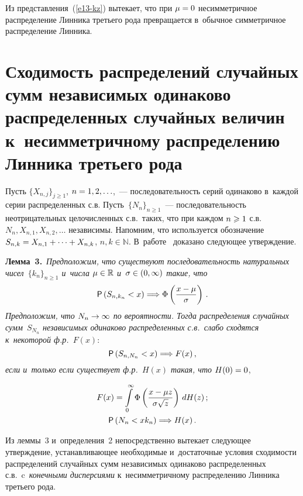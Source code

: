 \begin{multicols}{2}
\smallskip

Из представления~(\ref{e13-kz}) вытекает, что при $\mu\hm=0$ несимметричное
распределение Линника третьего рода превращается в~обычное
симметричное распределение Линника.

\section{Сходимость распределений случайных сумм независимых одинаково
распределенных случайных величин к~несимметричному распределению
Линника третьего рода}

Пусть $\{X_{n,j}\}_{j\geqslant1}$, $n\hm=1,2,\ldots$,~--- последовательность
серий одинаково в~каждой серии распределенных с.в. Пусть~$\{N_n\}_{n\geqslant1}$~--- 
последовательность неотрицательных
целочисленных с.в.\ таких, что при каждом $n\hm\geqslant1$ 
с.в.~$N_n,X_{n,1},X_{n,2},\ldots$ независимы. Напомним, что используется
обозначение $S_{n,k}\hm=X_{n,1}+\cdots +X_{n,k}$, $n,k\in\mathbb{N}$. 
В~работе~\cite{Korolev2013} доказано следующее утверждение.

\smallskip

\noindent
\textbf{Лемма~3.}\ \textit{Предположим, что существуют последовательность
натуральных чисел~$\{k_n\}_{n\geqslant 1}$ и~числа $\mu\hm\in\mathbb{R}$ 
и~$\sigma\hm\in(0,\infty)$ такие, что}
\begin{equation}
{\sf P}\left(S_{n,k_n}<x\right)\Longrightarrow
\Phi\left(\displaystyle\frac{\displaystyle x-\mu\mathstrut}{\displaystyle \sigma\mathstrut}\right)\,.\label{e19-kz}
\end{equation}
\textit{Предположим, что $N_n\hm\to\infty$ по вероятности. Тогда распределения
случайных сумм~$S_{N_n}$ независимых одинаково распределенных с.в.\
слабо сходятся к~некоторой ф.р.~$F(x)$}:
$$
{\sf P}\left(S_{n,N_n}<x\right)\Longrightarrow F(x)\,,
$$
\textit{если и~только если существует ф.р.~$H(x)$ такая, что $H(0)\hm=0$},

\noindent
\begin{gather*}
F(x)=\int\limits_{0}^{\infty}\Phi\left(\displaystyle\frac{\displaystyle x-\mu z\mathstrut}{\displaystyle \sigma\sqrt{z}\mathstrut}\right)\,dH(z)\,;
\\
{\sf P}\left(N_n<xk_n\right)\Longrightarrow H(x)\,.
\end{gather*}


Из леммы~3 и~определения~2 непосредственно вытекает следующее
утверждение, устанав\-ли\-ва\-ющее необходимые и~достаточные условия
сходимости распределений случайных сумм независимых одинаково
распределенных с.в.\ c~\textit{конечными дис\-пер\-си\-ями} к~несимметричному
распределению Линника третьего рода.


\end{multicols}
